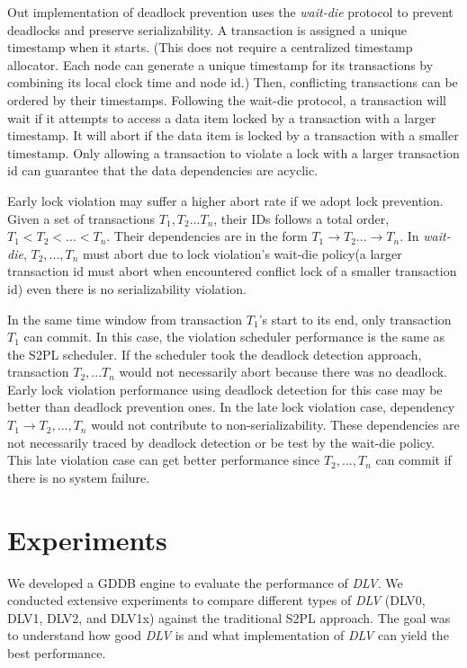 \documentclass[conference]{IEEEtran}
\begin{document}

Out implementation of deadlock prevention uses the \emph{wait-die} protocol to prevent deadlocks and preserve serializability.
A transaction is assigned a unique timestamp when it starts.
(This does not require a centralized timestamp allocator.
Each node can generate a unique timestamp for its transactions by combining its local clock time and node id.)
Then, conflicting transactions can be ordered by their timestamps.
Following the wait-die protocol, a transaction will wait if it attempts to access a data item locked by a transaction with a larger timestamp.
It will abort if the data item is locked by a transaction with a smaller timestamp.
Only allowing a transaction to violate a lock with a larger transaction id can guarantee that the data dependencies are acyclic.


Early lock violation may suffer a higher abort rate if we adopt lock prevention.
Given a set of transactions ${T_1, T_2... T_n}$, their IDs follows a total order, ${T_1 < T_2 < ... < T_n}$.
Their dependencies are in the form ${T_1 \rightarrow T_2 ... \rightarrow T_n}$.
In \emph{wait-die}, ${T_2, ..., T_n}$ must abort due to lock violation's wait-die policy(a larger transaction id must abort when encountered conflict lock of a smaller transaction id) even there is no serializability violation.

In the same time window from transaction ${T_1}$'s start to its end, only transaction ${T_1}$ can commit.
In this case, the violation scheduler performance is the same as the S2PL scheduler.
If the scheduler took the deadlock detection approach, transaction ${T_2, ... T_n}$ would not necessarily abort because there was no deadlock.
Early lock violation performance using deadlock detection for this case may be better than deadlock prevention ones.
In the late lock violation case, dependency ${T_1 \rightarrow T_2 , ... ,T_n}$ would not contribute to non-serializability.
These dependencies are not necessarily traced by deadlock detection or be test by the wait-die policy.
This late violation case can get better performance since ${T_2,..., T_n}$ can commit if there is no system failure.

\section{Experiments}
\label{sec:experiment}
We developed a GDDB engine to evaluate the performance of \emph{DLV}.
We conducted extensive experiments to compare different types of \emph{DLV} (DLV0, DLV1, DLV2, and DLV1x) against the traditional S2PL approach.
The goal was to understand how good \emph{DLV} is and what implementation of \emph{DLV} can yield the best performance. 
\end{document}
